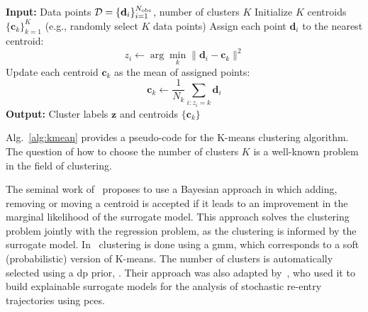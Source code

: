 \begin{algorithm}[htbp]
\caption{K-means clustering}
\label{alg:kmean}
\begin{algorithmic}[1]
\State \textbf{Input:} Data points $\mathcal{D} = \{\mathbf{d}_i\}_{i=1}^{N_{\mathrm{obs}}}$, number of clusters $K$
\State Initialize $K$ centroids $\{\mathbf{c}_k\}_{k=1}^K$ (e.g., randomly select $K$ data points)
\Repeat
    \State Assign each point $\mathbf{d}_i$ to the nearest centroid:
    \begin{equation*}
        z_i \gets \arg\min_{k} \|\mathbf{d}_i - \mathbf{c}_k\|^2
    \end{equation*}
    \State Update each centroid $\mathbf{c}_k$ as the mean of assigned points:
    \begin{equation*}
        \mathbf{c}_k \gets \frac{1}{N_k} \sum_{i: z_i = k} \mathbf{d}_i
    \end{equation*}
\State \textbf{Output:} Cluster labels $\mathbf{z}$ and centroids $\{\mathbf{c}_k\}$
\end{algorithmic}
\end{algorithm}

Alg.~\ref{alg:kmean} provides a pseudo-code for the K-means clustering algorithm. The question of how to choose the number of clusters $K$ is a well-known problem in the field of clustering. 

\smallskip
The seminal work of~\cite{kim2005} proposes to use a Bayesian approach in which adding, removing or moving a centroid is accepted if it leads to an improvement in the marginal likelihood of the surrogate model. This approach solves the clustering problem jointly with the regression problem, as the clustering is informed by the surrogate model. In~\cite{Sudret2023, Sudret2019} clustering is done using a \gls{gmm}, which corresponds to a soft (probabilistic) version of K-means. The number of clusters is automatically selected using a \gls{dp} prior, . Their approach was also adapted by~\cite{Palar2024}, who used it to build explainable surrogate models for the analysis of stochastic re-entry trajectories using \glspl{pce}. 

